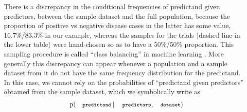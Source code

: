 \documentclass[utf8]{FrontiersinHarvard} %
\newcommand*{\wrench}{{\fontencoding{U}\fontfamily{fontawesomethree}\selectfont\symbol{114}}}
\newcommand{\mynotew}[1]{{\color{notecolour}\wrench\ #1}}
\newcommand*{\p}{\mathrm{p}}%
\renewcommand*{\|}[1][]{\nonscript\:#1\vert\nonscript\:\mathopen{}}
\newcommand*{\predictors}{\texttt{\footnotesize predictors}}
\newcommand*{\predictand}{\texttt{\footnotesize predictand}}
\newcommand*{\dataset}{\texttt{\footnotesize dataset}}
\begin{document}
There is a discrepancy in the conditional frequencies of predictand given predictors, between the sample dataset and the full population, because the proportion of positive vs negative disease cases in the latter has some value, 16.7\%/83.3\% in our example, whereas the samples for the trials (dashed line in the lower table) were hand-chosen so as to have a 50\%/50\% proportion. This sampling procedure is called \enquote{class balancing} in machine learning \citep{provost2000,drummondetal2005,weissetal2003}. More generally this discrepancy can appear whenever a population and a sample dataset from it do not have the same frequency distribution for the predictand. In this case, we cannot rely on the probabilities of \enquote{predictand given predictors} obtained from the sample dataset, which we symbolically write as
\begin{equation}
  \p(\predictand \| \predictors, \dataset)
\end{equation}
\end{document}
